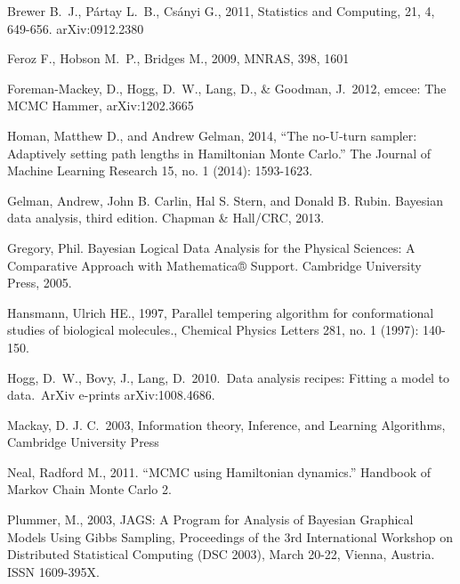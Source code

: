 \begin{thebibliography}{999}
 Brewer B.~J., P{\'a}rtay L.~B., Cs{\'a}nyi G., 2011,
Statistics and Computing, 21, 4, 649-656. arXiv:0912.2380

 Feroz F., Hobson M.~P., Bridges M., 2009, MNRAS, 398, 1601

 Foreman-Mackey, 
D., Hogg, D.~W., Lang, D., \& Goodman, J.\ 2012, emcee: The MCMC Hammer, arXiv:1202.3665 

Homan, Matthew D., and Andrew Gelman, 2014, ``The no-U-turn sampler: Adaptively setting path lengths in Hamiltonian Monte Carlo.'' The Journal of Machine Learning Research 15, no. 1 (2014): 1593-1623.

Gelman, Andrew, John B. Carlin, Hal S. Stern, and Donald B. Rubin. Bayesian data analysis, third edition. Chapman \& Hall/CRC, 2013.

Gregory, Phil. Bayesian Logical Data Analysis for the Physical Sciences: A Comparative Approach with Mathematica® Support. Cambridge University Press, 2005.

 Hansmann, Ulrich HE.,
1997, Parallel tempering algorithm for conformational studies of biological
molecules., Chemical Physics Letters 281, no. 1 (1997): 140-150.

 Hogg, D.~W., Bovy, J., 
Lang, D.\ 2010.\ Data analysis recipes: Fitting a model to data.\ ArXiv 
e-prints arXiv:1008.4686. 

 Mackay,
D. J. C.\ 2003, Information theory, Inference, and Learning
Algorithms, Cambridge University Press

Neal, Radford M., 2011. ``MCMC using Hamiltonian dynamics.''
Handbook of Markov Chain Monte Carlo 2.

Plummer, M., 2003, JAGS: A Program for Analysis of Bayesian Graphical Models
Using Gibbs Sampling, Proceedings of the 3rd International Workshop on
Distributed Statistical Computing (DSC 2003), March 20-22, Vienna, Austria.
ISSN 1609-395X.


\end{thebibliography}
